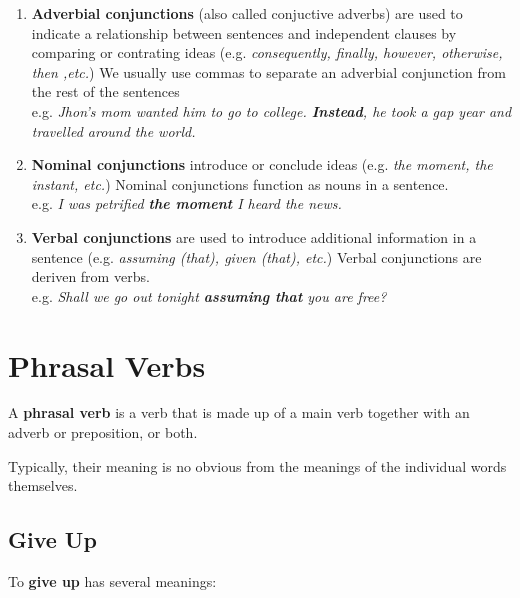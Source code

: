 \documentclass[hidelinks,10pt,a4paper]{article}
\begin{document}
\begin{enumerate}[label=(\alph*)]
	\item \textbf{Adverbial conjunctions} (also called conjuctive adverbs) are used to indicate a relationship between sentences and independent clauses by comparing or contrating ideas (e.g. \textit{consequently, finally, however, otherwise, then ,etc.}) We usually use commas to separate an adverbial conjunction from the rest of the sentences \\
		e.g. \textit{Jhon's mom wanted him to go to college. \textbf{Instead}, he took a gap year and travelled around the world. }
	\item \textbf{Nominal conjunctions} introduce or conclude ideas (e.g. \textit{the moment, the instant, etc.}) Nominal conjunctions function as nouns in a sentence. \\
		e.g. \textit{I was petrified \textbf{the moment} I heard the news.}
	\item \textbf{Verbal conjunctions} are used to introduce additional information in a sentence (e.g. \textit{assuming (that), given (that), etc.}) Verbal conjunctions are deriven from verbs. \\
		e.g. \textit{Shall we go out tonight \textbf{assuming that} you are free? }
\end{enumerate}


\section{Phrasal Verbs}
A \textbf{phrasal verb} is a verb that is made up of a main verb together with an adverb or preposition, or both.

Typically, their meaning is no obvious from the meanings of the individual words themselves.

\subsection{Give Up}

To \textbf{give up} has several meanings:
\end{document}

